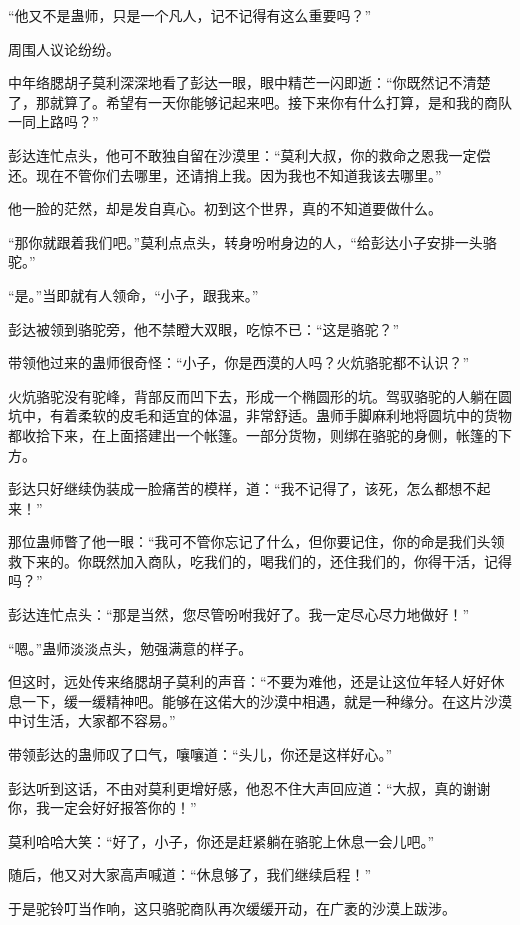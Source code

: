 \begin{this_body}
“他又不是蛊师，只是一个凡人，记不记得有这么重要吗？”

周围人议论纷纷。

中年络腮胡子莫利深深地看了彭达一眼，眼中精芒一闪即逝：“你既然记不清楚了，那就算了。希望有一天你能够记起来吧。接下来你有什么打算，是和我的商队一同上路吗？”

彭达连忙点头，他可不敢独自留在沙漠里：“莫利大叔，你的救命之恩我一定偿还。现在不管你们去哪里，还请捎上我。因为我也不知道我该去哪里。”

他一脸的茫然，却是发自真心。初到这个世界，真的不知道要做什么。

“那你就跟着我们吧。”莫利点点头，转身吩咐身边的人，“给彭达小子安排一头骆驼。”

“是。”当即就有人领命，“小子，跟我来。”

彭达被领到骆驼旁，他不禁瞪大双眼，吃惊不已：“这是骆驼？”

带领他过来的蛊师很奇怪：“小子，你是西漠的人吗？火炕骆驼都不认识？”

火炕骆驼没有驼峰，背部反而凹下去，形成一个椭圆形的坑。驾驭骆驼的人躺在圆坑中，有着柔软的皮毛和适宜的体温，非常舒适。蛊师手脚麻利地将圆坑中的货物都收拾下来，在上面搭建出一个帐篷。一部分货物，则绑在骆驼的身侧，帐篷的下方。

彭达只好继续伪装成一脸痛苦的模样，道：“我不记得了，该死，怎么都想不起来！”

那位蛊师瞥了他一眼：“我可不管你忘记了什么，但你要记住，你的命是我们头领救下来的。你既然加入商队，吃我们的，喝我们的，还住我们的，你得干活，记得吗？”

彭达连忙点头：“那是当然，您尽管吩咐我好了。我一定尽心尽力地做好！”

“嗯。”蛊师淡淡点头，勉强满意的样子。

但这时，远处传来络腮胡子莫利的声音：“不要为难他，还是让这位年轻人好好休息一下，缓一缓精神吧。能够在这偌大的沙漠中相遇，就是一种缘分。在这片沙漠中讨生活，大家都不容易。”

带领彭达的蛊师叹了口气，嚷嚷道：“头儿，你还是这样好心。”

彭达听到这话，不由对莫利更增好感，他忍不住大声回应道：“大叔，真的谢谢你，我一定会好好报答你的！”

莫利哈哈大笑：“好了，小子，你还是赶紧躺在骆驼上休息一会儿吧。”

随后，他又对大家高声喊道：“休息够了，我们继续启程！”

于是驼铃叮当作响，这只骆驼商队再次缓缓开动，在广袤的沙漠上跋涉。


\end{this_body}
